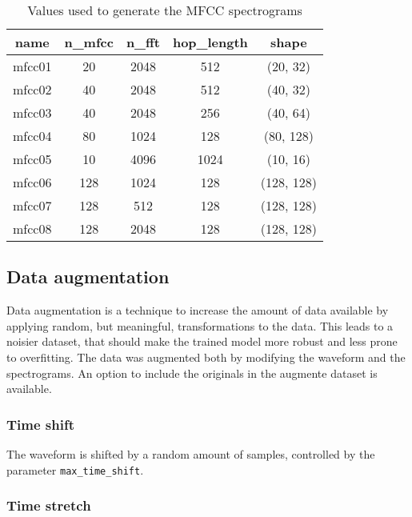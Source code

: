 \begin{table}[t!]
    \centering
    \caption{Values used to generate the MFCC spectrograms}
    \label{tab:mfcc_values}
    \begin{tabular}{|c|cccc|}
        \hline
        name & n\_mfcc & n\_fft & hop\_length & shape \\
        \hline
        mfcc01 & 20  & 2048 & 512  & (20, 32) \\
        mfcc02 & 40  & 2048 & 512  & (40, 32) \\
        mfcc03 & 40  & 2048 & 256  & (40, 64) \\
        mfcc04 & 80  & 1024 & 128  & (80, 128) \\
        mfcc05 & 10  & 4096 & 1024 & (10, 16) \\
        mfcc06 & 128 & 1024 & 128  & (128, 128) \\
        mfcc07 & 128 & 512  & 128  & (128, 128) \\
        mfcc08 & 128 & 2048 & 128  & (128, 128) \\
        \hline
    \end{tabular}
\end{table}

\subsection{Data augmentation}

Data augmentation is a technique to increase the amount of data available by
applying random, but meaningful, transformations to the data. This leads to a
noisier dataset, that should make the trained model more robust and less prone
to overfitting. The data was augmented both by modifying the waveform and the
spectrograms. An option to include the originals in the augmente dataset is
available.

\subsubsection{Time shift}

The waveform is shifted by a random amount of samples, controlled by the
parameter \texttt{max\_time\_shift}.

\subsubsection{Time stretch}

